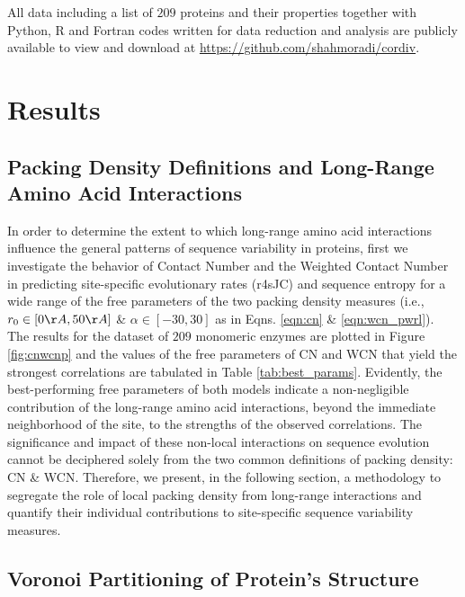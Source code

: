\documentclass[11pt]{article}
\begin{document}
    All data including a list of $209$ proteins and their properties together with Python, R and Fortran codes written for data reduction and analysis are publicly available to view and download at \url{https://github.com/shahmoradi/cordiv}.


\section{Results}

    \subsection*{Packing Density Definitions and Long-Range Amino Acid Interactions}
    \label{sec:cnwcn}

    In order to determine the extent to which long-range amino acid interactions influence the general patterns of sequence variability in proteins, first we investigate the behavior of Contact Number and the Weighted Contact Number in predicting site-specific evolutionary rates (r4sJC) and sequence entropy for a wide range of the free parameters of the two packing density measures (i.e., $r_0\in[0\AA,50\AA]$ \& $\alpha\in[-30,30]$ as in Eqns. \ref{eqn:cn} \& \ref{eqn:wcn_pwrl}). \\

    The results for the dataset of $209$ monomeric enzymes are plotted in Figure \ref{fig:cnwcnp} and the values of the free parameters of CN and WCN that yield the strongest correlations are tabulated in Table \ref{tab:best_params}. Evidently, the best-performing free parameters of both models indicate a non-negligible contribution of the long-range amino acid interactions, beyond the immediate neighborhood of the site, to the strengths of the observed correlations. The significance and impact of these non-local interactions on sequence evolution cannot be deciphered solely from the two common definitions of packing density: CN \& WCN. Therefore, we present, in the following section, a methodology to segregate the role of local packing density from long-range interactions and quantify their individual contributions to site-specific sequence variability measures.

    \subsection*{Voronoi Partitioning of Protein's Structure}
    \label{sec:voro}
\end{document}
